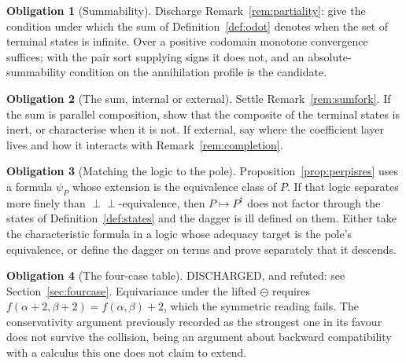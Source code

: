 \documentclass[11pt]{article}
\theoremstyle{definition}
\newtheorem{obligation}{Obligation}
\theoremstyle{remark}
\newcommand{\negop}{\ensuremath{\ominus}}
\begin{document}
\begin{obligation}[Summability]
\label{ob:summability}
Discharge Remark~\ref{rem:partiality}: give the condition under which the sum of
Definition~\ref{def:odot} denotes when the set of terminal states is infinite.
Over a positive codomain monotone convergence suffices; with the pair sort
supplying signs it does not, and an absolute-summability condition on the
annihilation profile is the candidate.
\end{obligation}

\begin{obligation}[The sum, internal or external]
\label{ob:sum}
Settle Remark~\ref{rem:sumfork}. If the sum is parallel composition, show that
the composite of the terminal states is inert, or characterise when it is not.
If external, say where the coefficient layer lives and how it interacts with
Remark~\ref{rem:completion}.
\end{obligation}

\begin{obligation}[Matching the logic to the pole]
\label{ob:logicmatch}
Proposition~\ref{prop:perpisres} uses a formula $\psi_P$ whose extension is the
equivalence class of $P$. If that logic separates more finely than
$\perp\perp$-equivalence, then $P \mapsto P^{\dagger}$ does not factor through
the states of Definition~\ref{def:states} and the dagger is ill defined on them.
Either take the characteristic formula in a logic whose adequacy target is the
pole's equivalence, or define the dagger on terms and prove separately that it
descends.
\end{obligation}

\begin{obligation}[The four-case table]
DISCHARGED, and refuted: see Section~\ref{sec:fourcase}. Equivariance under the
lifted $\negop$ requires $f(\alpha+2,\beta+2) = f(\alpha,\beta)+2$, which the
symmetric reading fails. The conservativity argument previously recorded as the
strongest one in its favour does not survive the collision, being an argument
about backward compatibility with a calculus this one does not claim to extend.
\end{obligation}
\end{document}
